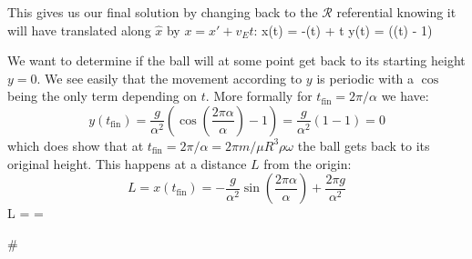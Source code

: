 This gives us our final solution by changing back to the $\mathcal{R}$ referential knowing it will have translated along $\hat{x}$ by $x = x' + v_E t$:
\be
    x(t) = -\sin(\alpha t) + t
    \label{eq:x_fall}
\ee
\be
    y(t) = (\cos(\alpha t) - 1)
    \label{eq:y_fall}
\ee

We want to determine if the ball will at some point get back to its starting height $y = 0$. We see easily that the movement according to $y$ is periodic with a $\cos$ being the only term depending on $t$. More formally for $t_\mathrm{fin} = 2\pi / \alpha$ we have:
\[ y(t_\mathrm{fin}) = \frac{g}{\alpha^2}\left(\cos\left(\frac{2\pi \alpha}{\alpha}\right) - 1\right) = \frac{g}{\alpha^2}(1 - 1) = 0 \]
which does show that at $t_\mathrm{fin} = 2\pi / \alpha = 2\pi m / \mu R^3\rho\omega$ the ball gets back to its original height. This happens at a distance $L$ from the origin:
\[
    L = x(t_\mathrm{fin}) = -\frac{g}{\alpha^2}\sin\left(\frac{2\pi \alpha}{\alpha}\right) + \frac{2\pi g}{\alpha^2}
\]
\be
    L =  = 
\ee

\#
